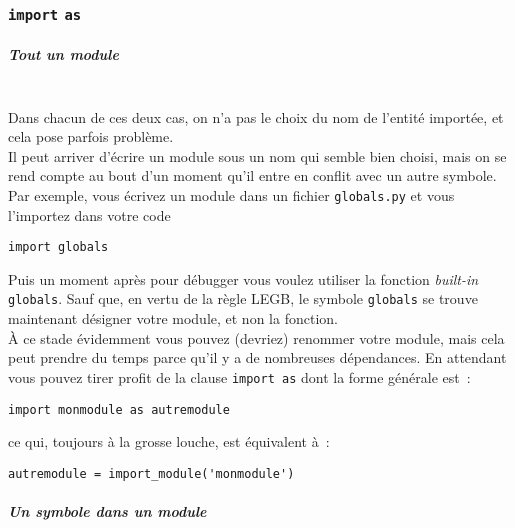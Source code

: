     \hypertarget{import-as}{%
\subsubsection{\texorpdfstring{\texttt{import}
\texttt{as}}{import as}}\label{import-as}}

    \hypertarget{tout-un-module}{%
\subparagraph{Tout un module\\\\}\label{tout-un-module}}

    Dans chacun de ces deux cas, on n'a pas le choix du nom de l'entité
importée, et cela pose parfois problème.\\

Il peut arriver d'écrire un module sous un nom qui semble bien choisi,
mais on se rend compte au bout d'un moment qu'il entre en conflit avec
un autre symbole.\\

Par exemple, vous écrivez un module dans un fichier \texttt{globals.py}
et vous l'importez dans votre code

    \begin{verbatim}
import globals
\end{verbatim}

    Puis un moment après pour débugger vous voulez utiliser la fonction
\emph{built-in} \texttt{globals}. Sauf que, en vertu de la règle LEGB,
le symbole \texttt{globals} se trouve maintenant désigner votre module,
et non la fonction.\\

    À ce stade évidemment vous pouvez (devriez) renommer votre module, mais
cela peut prendre du temps parce qu'il y a de nombreuses dépendances. En
attendant vous pouvez tirer profit de la clause \texttt{import\ as} dont
la forme générale est~:

    \begin{verbatim}
import monmodule as autremodule
\end{verbatim}

    ce qui, toujours à la grosse louche, est équivalent à~:

    \begin{verbatim}
autremodule = import_module('monmodule')
\end{verbatim}

    \hypertarget{un-symbole-dans-un-module}{%
\subparagraph{Un symbole dans un
module\\\\}\label{un-symbole-dans-un-module}}

